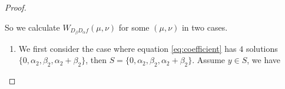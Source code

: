 \documentclass{article}
\newcommand{\0}{\textbf{0}}
\newcommand{\1}{\textbf{1}}
\newcommand{\TRACE}{\operatorname{Tr}_1^k}
\theoremstyle{plain}
\begin{document}
\begin{proof}
\begin{enumerate}[label=\textbf{Case \arabic*},wide = 0pt]
    So we calculate $ W_{D_{\beta}D_{\alpha}f}(\mu,\nu) $ for some $ (\mu,\nu) $ in two cases.
    \begin{enumerate}[label=\textbf{Subcase \Alph{*}},itemindent=*,wide=\parindent]
        \item 
        We first consider the case where equation \eqref{eq:coefficient} has $ 4 $ solutions 
        $ \{0,\alpha_2,\beta_2,\alpha_2+\beta_2\} $, then $ S=\{0,\alpha_2,\beta_2,\alpha_2+\beta_2\} $. 
        Assume $ y\in S $, we have 

\end{enumerate}
\end{enumerate}
\end{proof}
\end{document}
